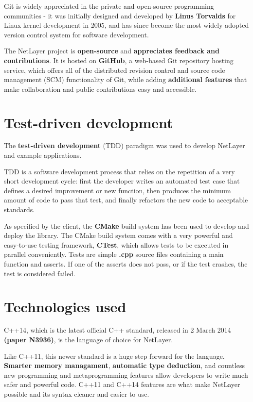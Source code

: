 \documentclass[11pt]{report}
\newcommand{\+}{\discretionary{\mbox{\scriptsize$\hookleftarrow$}}{}{}}
\renewcommand\emph{\textbf}
\begin{document}
                Git is widely appreciated in the private and open-source programming communities - it was initially designed and developed by \emph{Linus Torvalds} for Linux kernel development in 2005, and has since become the most widely adopted version control system for software development.

                The NetLayer project is \emph{open-source} and \emph{appreciates feedback and contributions}. It is hosted on \emph{GitHub}, a web-based Git repository hosting service, which offers all of the distributed revision control and source code management (SCM) functionality of Git, while adding \emph{additional features} that make collaboration and public contributions easy and accessible.

            \section{Test-driven development}
                The \emph{test-driven development} (TDD) paradigm was used to develop NetLayer and example applications. 

                TDD is a software development process that relies on the repetition of a very short development cycle: first the developer writes an automated test case that defines a desired improvement or new function, then produces the minimum amount of code to pass that test, and finally refactors the new code to acceptable standards.

                As specified by the client, the \emph{CMake} build system has been used to develop and deploy the library. The CMake build system comes with a very powerful and easy-to-use testing framework, \emph{CTest}, which allows tests to be executed in parallel conveniently. Tests are simple \emph{.cpp} source files containing a main function and asserts. If one of the asserts does not pass, or if the test crashes, the test is considered failed.

            \section{Technologies used}
                C++14, which is the latest official C++ standard, released in 2 March 2014 \emph{(paper N3936)}, is the language of choice for NetLayer.
                
                Like C++11, this newer standard is a huge step forward for the language. \emph{Smarter memory managament}, \emph{automatic type deduction}, and countless new programming and metaprogramming features allow developers to write much safer and powerful code.
                C++11 and C++14 features are what make NetLayer possible and its syntax cleaner and easier to use.
\end{document}
